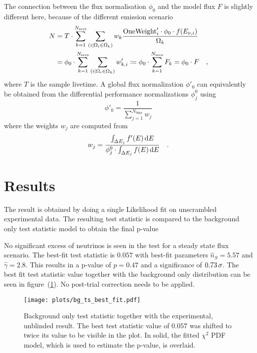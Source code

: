 The connection between the flux normalisation $\phi_0$ and the model flux $F$ is slightly different here, because of the different emission scenario
\begin{align}
  N
  &= T\cdot\sum_{k=1}^{N_\text{srcs}} \sum_{(i|\Omega_i \in \Omega_k)}
      w_k\frac{\text{OneWeight}'_i\cdot\phi_0\cdot f(E_{\nu,i})}{\Omega_k} \\
  &= \phi_0 \cdot
      \sum_{k=1}^{N_\text{srcs}}
      \sum_{(i|\Omega_i \in \Omega_k)} w'_{k,i}
  \coloneqq \phi_0 \cdot \sum_{k=1}^{N_\text{srcs}} F_k = \phi_0 \cdot F
  \quad\text{,}
\end{align}
where $T$ is the sample livetime.
A global flux normalization $\phi'_0$ can equivalently be obtained from the differential performance normalizations $\phi_j^0$ using
\begin{equation}
  \phi'_0 = \frac{1}{\sum_{j=1}^{N_\text{bins}} w_j}
\end{equation}
where the weights $w_j$ are computed from
\begin{equation}
  w_j = \frac{\int_{\Delta E_j} f'(E)\,\text{d}E}
             {\phi_j^0\cdot\int_{\Delta E_j} f(E)\,\text{d}E}
  \quad\text{.}
\end{equation}


\section{Results}
The result is obtained by doing a single Likelihood fit on unscrambled experimental data.
The resulting test statistic is compared to the background only test statistic model to obtain the final p-value

No significant excess of neutrinos is seen in the test for a steady state flux scenario.
The best-fit test statistic is $\num{0.057}$ with best-fit parameters $\hat{n}_S = \num{5.57}$ and $\hat{\gamma} = \num{2.8}$.
This results in a p-value of $p=0.47$ and a significance of $\num{0.73}\,\sigma$.
The  best fit test statistic value together with the background only distribution can be seen in figure~(\ref{fig:tindep_bg_ts_best_fit}).
No post-trial correction needs to be applied.

\begin{figure}[htbp]
  \centering
  \texttt{[image: plots/bg\_ts\_best\_fit.pdf]}
  \caption[Experimental result of the time-integrated analysis]{
    Background only test statistic together with the experimental, unblinded result.
    The best test statistic value of $\num{0.057}$ was shifted to twice its value to be visible in the plot.
    In solid, the fitted $\chi^2$ PDF model, which is used to estimate the p-value, is overlaid.
  }
  \label{fig:tindep_bg_ts_best_fit}
\end{figure}
